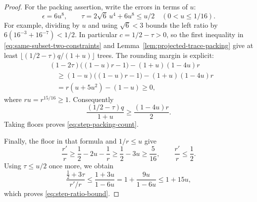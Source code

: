 \begin{proof}
For the packing assertion, write the errors in terms of $u$:
\[
 \epsilon=6u^8,\qquad\tau=2\sqrt6\,u^4+6u^8\leq u/2
 \quad(0<u\leq1/16).
\]
For example, dividing by $u$ and using $\sqrt6<3$ bounds the left
ratio by $6(16^{-3}+16^{-7})<1/2$.
In particular $c=1/2-\tau>0$, so the first inequality in
\eqref{eq:same-subset-two-constraints} and
Lemma~\ref{lem:projected-trace-packing} give at least
$\lfloor(1/2-\tau)q/(1+u)\rfloor$ trees.
The rounding margin is explicit:
\begin{align*}
 &(1-2\tau)\bigl((1-u)r-1\bigr)
            -(1+u)(1-4u)r\\
 &\quad\geq(1-u)\bigl((1-u)r-1\bigr)
            -(1+u)(1-4u)r\\
 &\quad=r(u+5u^2)-(1-u)\geq0,
\end{align*}
where $ru=r^{15/16}\geq1$.  Consequently
\[
 \frac{(1/2-\tau)q}{1+u}\geq\frac{(1-4u)r}{2}.
\]
Taking floors proves \eqref{eq:step-packing-count}.

Finally, the floor in that formula and $1/r\leq u$ give
\[
 \frac{r'}r\geq\frac12-2u-\frac1r
              \geq\frac12-3u\geq\frac5{16},
 \qquad\frac{r'}r\leq\frac12.
\]
Using $\tau\leq u/2$ once more, we obtain
\[
 \frac{\frac12+3\tau}{r'/r}
 \leq\frac{1+3u}{1-6u}
 =1+\frac{9u}{1-6u}\leq1+15u,
\]
which proves \eqref{eq:step-ratio-bound}.
\end{proof}
